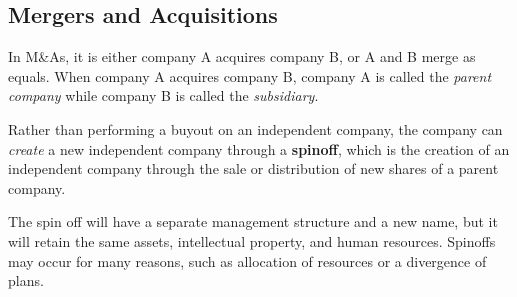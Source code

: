 \documentclass{article}
\begin{document}
  \subsection{Mergers and Acquisitions}

    In M\&As, it is either company A acquires company B, or A and B merge as equals. When company A acquires company B, company A is called the \textit{parent company} while company B is called the \textit{subsidiary}. 

    \begin{definition}[Spinoff]
      Rather than performing a buyout on an independent company, the company can \textit{create} a new independent company through a \textbf{spinoff}, which is the creation of an independent company through the sale or distribution of new shares of a parent company. 

      The spin off will have a separate management structure and a new name, but it will retain the same assets, intellectual property, and human resources. Spinoffs may occur for many reasons, such as allocation of resources or a divergence of plans. 
    \end{definition}
\end{document}
